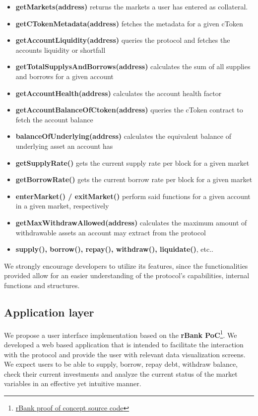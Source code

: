 \documentclass{article}
\begin{document}
\begin{itemize}
\item \textbf{getMarkets(address)} returns the markets a user has entered as collateral.
\item \textbf{getCTokenMetadata(address)} fetches the metadata for a given cToken
\item \textbf{getAccountLiquidity(address)} queries the protocol and fetches the accounts liquidity or shortfall
\item \textbf{getTotalSupplysAndBorrows(address)} calculates the sum of all supplies and borrows for a given account
\item \textbf{getAccountHealth(address)} calculates the account health factor
\item \textbf{getAccountBalanceOfCtoken(address)} queries the cToken contract to fetch the account balance
\item \textbf{balanceOfUnderlying(address)} calculates the equivalent balance of underlying asset an account has
\item \textbf{getSupplyRate()} gets the current supply rate per block for a given market
\item \textbf{getBorrowRate()} gets the current borrow rate per block for a given market
\item \textbf{enterMarket() / exitMarket()} perform said functions for a given account in a given market, respectively
\item \textbf{getMaxWithdrawAllowed(address)} calculates the maximum amount of withdrawable assets an account may extract from the protocol
\item \textbf{supply(), borrow(), repay(), withdraw(), liquidate()}, etc..
\end{itemize}

We strongly encourage developers to utilize its features, since the functionalities provided allow for an easier understanding of the protocol's capabilities, internal functions and structures.

\subsection{Application layer}
We propose a user interface implementation based on the \textbf{rBank PoC}\footnote{\href{https://github.com/rsk/rbank}{rBank proof of concept source code}}. We developed a web based application that is intended to facilitate the interaction with the protocol and provide the user with relevant data visualization screens. We expect users to be able to supply, borrow, repay debt, withdraw balance, check their current investments and analyze the current status of the market variables in an effective yet intuitive manner.
\end{document}
